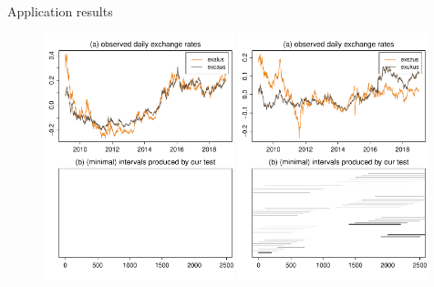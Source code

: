 \documentclass[10pt]{beamer}
\begin{document}
%
\begin{frame}{Application results}
	\begin{figure}
		\includegraphics[width=0.49\textwidth]{plots/exalus_vs_excaus_presentation}
		\hfill
		\includegraphics[width=0.49\textwidth]{plots/exszus_vs_exukus_presentation}
	\end{figure}
\end{frame}
\end{document}
